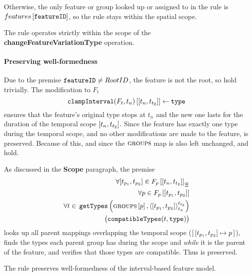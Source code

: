 Otherwise, the only feature or group looked up or assigned to in the rule is $features \left[ \texttt{featureID} \right]$, so the rule stays within the spatial scope.
\\

\begin{lemma}
   The  rule operates strictly within the scope of the \textbf{changeFeatureVariationType} operation.
   \label{lemma:change-feature-variation-type-scope}
\end{lemma}

\paragraph{Preserving well-formedness}
Due to the premise $\texttt{featureID} \neq RootID$, the feature is not the root, so  hold trivially. The modification to $F_t$
\[
   \lookup{\var{clampInterval}(F_t, t_n)}{\interval{t_n}{t_{t_2}}} \assign \var{type}
\]
ensures that the feature's original type stops at $t_n$ and the new one lasts for the duration of the temporal scope $\interval{t_n}{t_{t_2}}$. Since the feature has exactly one type during the temporal scope, and no other modifications are made to the feature,  is preserved. Because of this, and since the $\textsc{groups}{}{}$ map is also left unchanged,  and  hold. 

As discussed in the \textbf{Scope} paragraph, the premise 
\[
   \begin{split}
      \forall \interval{t_{p_1}}{t_{p_2}} \in \overlapping{F_p}{t_n}{t_{t_2}}  \\ %
      \forall p \in \lookup{F_p}{\interval{t_{p_1}}{t_{p_2}}}  \\%
      \forall t \in \, \var{getTypes}\left(\lookup{\groups}{p}, \clamp{\interval{t_{p_1}}{t_{p_2}}}{t_n}{t_{t_2}}\right)  \\
          \big(\var{compatibleTypes}(t, \var{type})\big) 
    \end{split}
\]
looks up all parent mappings overlapping the temporal scope ($\intervalmapping{t_{p_1}}{t_{p_2}}{p}$), finds the types each parent group has during the scope and \emph{while} it is the parent of the feature, and verifies that those types are compatible. Thus  is preserved.
\\

\begin{lemma}
   The  rule preserves well-formedness of the interval-based feature model. 
   \label{lemma:change-feature-variation-type-well-formed}
\end{lemma}

